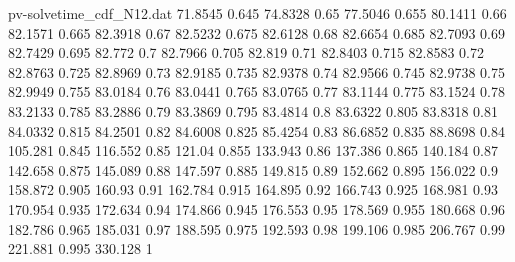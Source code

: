 \begin{filecontents*}[overwrite]{pv-solvetime_cdf_N12.dat}
71.8545 0.645
74.8328 0.65
77.5046 0.655
80.1411 0.66
82.1571 0.665
82.3918 0.67
82.5232 0.675
82.6128 0.68
82.6654 0.685
82.7093 0.69
82.7429 0.695
82.772 0.7
82.7966 0.705
82.819 0.71
82.8403 0.715
82.8583 0.72
82.8763 0.725
82.8969 0.73
82.9185 0.735
82.9378 0.74
82.9566 0.745
82.9738 0.75
82.9949 0.755
83.0184 0.76
83.0441 0.765
83.0765 0.77
83.1144 0.775
83.1524 0.78
83.2133 0.785
83.2886 0.79
83.3869 0.795
83.4814 0.8
83.6322 0.805
83.8318 0.81
84.0332 0.815
84.2501 0.82
84.6008 0.825
85.4254 0.83
86.6852 0.835
88.8698 0.84
105.281 0.845
116.552 0.85
121.04 0.855
133.943 0.86
137.386 0.865
140.184 0.87
142.658 0.875
145.089 0.88
147.597 0.885
149.815 0.89
152.662 0.895
156.022 0.9
158.872 0.905
160.93 0.91
162.784 0.915
164.895 0.92
166.743 0.925
168.981 0.93
170.954 0.935
172.634 0.94
174.866 0.945
176.553 0.95
178.569 0.955
180.668 0.96
182.786 0.965
185.031 0.97
188.595 0.975
192.593 0.98
199.106 0.985
206.767 0.99
221.881 0.995
330.128 1
\end{filecontents*}
\documentclass[conference]{IEEEtran}

\newif\ifanonymous
\anonymoustrue        %

\usepackage[T1]{fontenc}
\usepackage[utf8]{inputenc}
\usepackage{amsmath,amssymb,amsthm,mathtools}
\usepackage{booktabs,multirow,array,tabularx}
\usepackage{graphicx}
\usepackage[table]{xcolor}
\usepackage{tikz,pgfplots}
\usetikzlibrary{positioning,arrows.meta,fit,backgrounds,calc,shapes.geometric}
\pgfplotsset{compat=1.18}
\usepackage{algorithm}
\usepackage{algpseudocode}
\usepackage{cite}
\usepackage{enumitem}
\usepackage{microtype}
\usepackage[hidelinks]{hyperref}
\usepackage[capitalize,nameinlink]{cleveref}
\setlength{\emergencystretch}{1.5em}


\newcommand{\pending}[1][pending]{\textcolor{cRed}{\textbf{[#1]}}}

